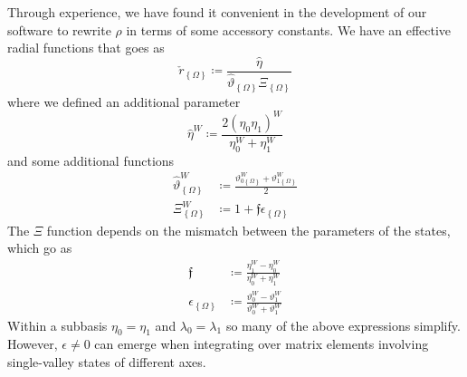 Through experience, we have found it convenient in the development of our
software to rewrite $\rho$ in terms of some accessory constants. We have an effective radial functions that goes as
\begin{equation}
\check{r}_{\left\{\Omega\right\}}
    \coloneqq
        \frac
        {\hat{\eta}}
        {\hat{\vartheta}_{\left\{\Omega\right\}}\Xi_{\left\{\Omega\right\}}}
\end{equation}
where we defined an additional parameter
\begin{equation}
\hat{\eta}^{W}
    \coloneqq
        \frac
        { 2\left(\eta_{0}\eta_{1}\right)^{W} }
        { \eta_{0}^{W} + \eta_{1}^{W} }
\end{equation}
and some additional functions
\begin{align}
\hat{\vartheta}_{\left\{\Omega\right\}}^{W}
    &\coloneqq
        \frac{
            \vartheta_{0\left\{\Omega\right\}}^{W}
                +
            \vartheta_{1\left\{\Omega\right\}}^{W}
        }
        {2}
\\
\Xi_{\left\{\Omega\right\}}^{W}
    &\coloneqq
        1 + \mathfrak{f}\epsilon_{\left\{\Omega\right\}}
\end{align}
The $\Xi$ function depends on the mismatch between the parameters of the states,
which go as
\begin{align}
\mathfrak{f}
    & \coloneqq 
        \frac{\eta_{1}^{W}-\eta_{0}^{W}}{\eta_{0}^{W}+\eta_{1}^{W}}
\\
\epsilon_{\left\{\Omega\right\}}
    & \coloneqq 
        \frac
        {\vartheta_{0}^{W}-\vartheta_{1}^{W}}
        {\vartheta_{0}^{W}+\vartheta_{1}^{W}}
\end{align}
Within a subbasis $\eta_{0} = \eta_{1}$ and $\lambda_{0} = \lambda_{1}$ so many
of the above expressions simplify. However, $\epsilon \ne 0$ can emerge when
integrating over matrix elements involving single-valley states of different
axes.

